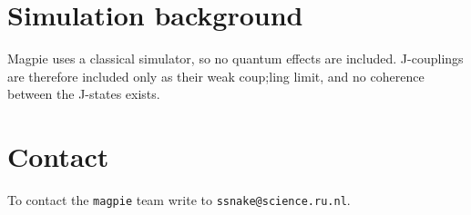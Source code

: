 \documentclass[11pt,a4paper]{article}
\begin{document}
\section{Simulation background}
Magpie uses a classical simulator, so no quantum effects are included. J-couplings are therefore included only as their weak coup;ling limit, and no coherence between the J-states exists.



\section{Contact}
To contact the \texttt{magpie} team write to \texttt{ssnake@science.ru.nl}.



\end{document}
